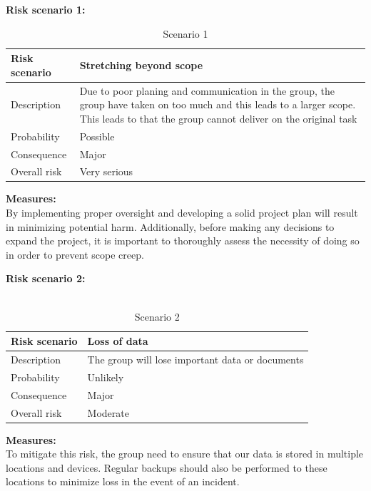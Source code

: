 \vspace{1cm}
    \begin{table}[!ht]
    \raggedright
    \textbf{Risk scenario 1:}
    \\
    \centering
    \begin{tabular}{|p{}|p{}|}
    \hline
        Risk scenario & Stretching beyond scope \\ \hline
        Description & Due to poor planing and communication in the group, the group have taken on too much and this leads to a larger scope. This leads to that the group cannot deliver on the original task \\ \hline   
        Probability & Possible  \\ \hline
        Consequence & Major  \\ \hline   
        Overall risk & \cellcolor{red!} Very serious  \\ \hline
    
    \end{tabular}
    \caption{Scenario 1}
    \raggedright
    \textbf{Measures:}
    \\ 
    By implementing proper oversight and developing a solid project plan will result in  minimizing potential harm. Additionally, before making any decisions to expand the project, it is important to thoroughly assess the necessity of doing so in order to prevent scope creep.
\end{table}


\vspace{1cm}
\begin{table}[!ht]
    \raggedright
    \textbf{Risk scenario 2:}
    \\~
    \centering
    \begin{tabular}{|p{}|p{}|}
    \hline
        Risk scenario & Loss of data \\ \hline
        Description & The group will lose important data or documents  \\ \hline
        Probability & Unlikely \\ \hline
        Consequence & Major \\ \hline
        Overall risk & \cellcolor{yellow!} Moderate \\ \hline
    \end{tabular}
    \caption{Scenario 2}
    \raggedright
    \textbf{Measures:}
    \\ 
    To mitigate this risk, the group need to ensure that our data is stored in multiple locations and devices. Regular backups should also be performed to these locations to minimize loss in the event of an incident.
\end{table}



